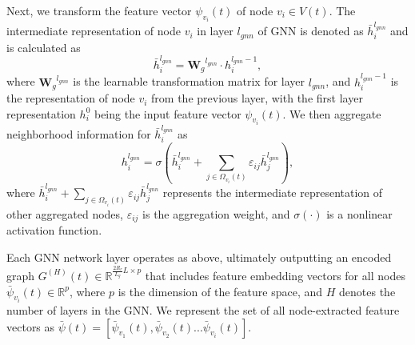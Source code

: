 \documentclass[lettersize,journal,onecolumn]{IEEEtran}
\begin{document}
Next, we transform the feature vector ${{\psi }_{{{v}_{i}}}}\left( t \right)$ of node ${{v}_{i}}\in V(t)$. The intermediate representation of node ${{v}_{i}}$ in layer ${{l}_{gnn}}$ of
 GNN is denoted as $\bar{h}_{i}^{{{l}_{gnn}}}$ and is calculated as
\begin{equation}
\bar{h}_{i}^{{{l}_{gnn}}}={{\mathbf{W}}_{g}}^{{{l}_{gnn}}}\cdot h_{i}^{{{l}_{gnn}}-1}
\label{eq16},
\end{equation}
where ${{\mathbf{W}}_{g}}^{{{l}_{gnn}}}$ is the learnable transformation matrix for layer ${{l}_{gnn}}$, and $h_{i}^{{{l}_{gnn}}-1}$ is the representation of node ${{v}_{i}}$ from the previous layer, with the first layer representation $h_{i}^{0}$ being the input feature vector ${{\psi }_{{{v}_{i}}}}\left( t \right)$.
We then aggregate neighborhood information for $\bar{h}_{i}^{{{l}_{gnn}}}$ as 
\begin{equation}
h_{i}^{{{l}_{gnn}}}=\sigma \left( \bar{h}_{i}^{{{l}_{gnn}}}+\sum\limits_{j\in {{\Omega }_{{{v}_{i}}}}\left( t \right)}{{{\varepsilon }_{ij}}} \bar{h}_{j}^{{{l}_{gnn}}} \right),
\label{eq17}
\end{equation}
where $\bar{h}_{i}^{{{l}_{gnn}}}+\sum\limits_{j\in {{\Omega }_{{{v}_{i}}}}\left( t \right)}{{{\varepsilon }_{ij}}} \bar{h}_{j}^{{{l}_{gnn}}}$ represents the intermediate representation of other aggregated nodes, ${{\varepsilon }_{ij}}$ is the aggregation weight, and $\sigma (\cdot )$ is a nonlinear activation function. 

Each GNN network layer operates as above, ultimately outputting an encoded graph ${{G}^{(H)}}(t)\in {{\mathbb{R}}^{\frac{2{{R}_{r}}}{{{L}_{g}}}L\times p}}$ that includes feature embedding vectors for all nodes ${{\bar{\psi }}_{{{v}_{i}}}}\left( t \right)\in {{\mathbb{R}}^{p}}$, where $p$ is the dimension of the feature space, and $H$ denotes the number of layers in the GNN. We represent the set of all node-extracted feature vectors as $\bar{\psi }\left( t \right)=[{{\bar{\psi }}_{{{v}_{1}}}}\left( t \right),{{\bar{\psi }}_{{{v}_{2}}}}\left( t \right)...{{\bar{\psi }}_{{{v}_{i}}}}\left( t \right)]$.

 
\end{document}
